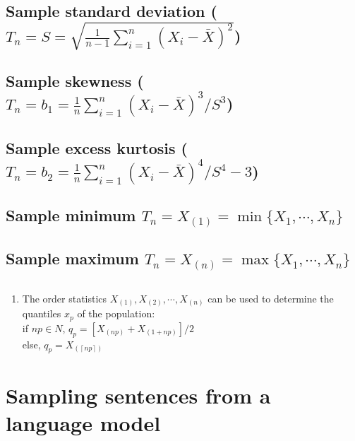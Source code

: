 \subsection{Sample standard deviation ($T_n = S = \sqrt{\frac{1}{n-1}\sum_{i=1}^{n} (X_i - \bar{X})^2}$) \cite{ism-1}}

\subsection{Sample skewness ($T_n = b_1 = \frac{1}{n} \sum_{i=1}^{n} (X_i - \bar{X})^3/S^3 $) \cite{ism-1}}

\subsection{Sample excess kurtosis ($T_n = b_2 = \frac{1}{n} \sum_{i=1}^{n} (X_i - \bar{X})^4/S^4 -3$) \cite{ism-1}}

\subsection{Sample minimum $T_n = X_{(1)} = \min\{X_1,\cdots,X_n\}$ \cite{ism-1}}

\subsection{Sample maximum $T_n = X_{(n)} = \max\{X_1,\cdots,X_n\}$ \cite{ism-1}}

\subsection*{}

\begin{enumerate}
    \item The order statistics $X_{(1)}, X_{(2)},\cdots, X_{(n)}$ can be used to determine the quantiles $x_p$ of the population:\\
    if $np \in N$, $q_p = [X_{(np)} + X_{(1+np)}]/2$\\
    else, $q_p = X_{( \left \lceil np \right \rceil)}$
\end{enumerate}


\section{Sampling sentences from a language model \cite{nlp-1}}\label{Sampling sentences from a language model}


